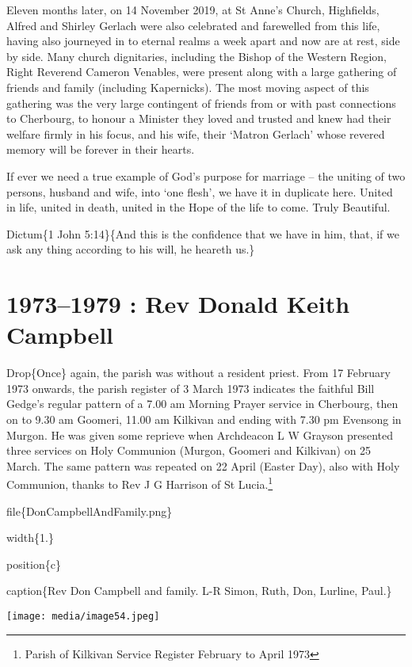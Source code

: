 Eleven months later, on 14 November 2019, at St Anne's Church, Highfields, Alfred and Shirley Gerlach were also celebrated and farewelled from this life, having also journeyed in to eternal realms a week apart and now are at rest, side by side. Many church dignitaries, including the Bishop of the Western Region, Right Reverend Cameron Venables, were present along with a large gathering of friends and family (including Kapernicks). The most moving aspect of this gathering was the very large contingent of friends from or with past connections to Cherbourg, to honour a Minister they loved and trusted and knew had their welfare firmly in his focus, and his wife, their `Matron Gerlach' whose revered memory will be forever in their hearts.

If ever we need a true example of God's purpose for marriage -- the uniting of two persons, husband and wife, into `one flesh', we have it in duplicate here. United in life, united in death, united in the Hope of the life to come. Truly Beautiful.

Dictum\{1 John 5:14\}\{And this is the confidence that we have in him, that, if we ask any thing according to his will, he heareth us.\}

\hypertarget{rev-donald-keith-campbell}{%
\chapter{1973--1979 : Rev Donald Keith Campbell}\label{rev-donald-keith-campbell}}

Drop\{Once\} again, the parish was without a resident priest. From 17 February 1973 onwards, the parish register of 3 March 1973 indicates the faithful Bill Gedge's regular pattern of a 7.00 am Morning Prayer service in Cherbourg, then on to 9.30 am Goomeri, 11.00 am Kilkivan and ending with 7.30 pm Evensong in Murgon. He was given some reprieve when Archdeacon L W Grayson presented three services on Holy Communion (Murgon, Goomeri and Kilkivan) on 25 March. The same pattern was repeated on 22 April (Easter Day), also with Holy Communion, thanks to Rev J G Harrison of St Lucia.\footnote{Parish of Kilkivan Service Register February to April 1973}

file\{DonCampbellAndFamily.png\}

width\{1.\}

position\{c\}

caption\{Rev Don Campbell and family. L-R Simon, Ruth, Don, Lurline, Paul.\}

\texttt{[image: media/image54.jpeg]}

